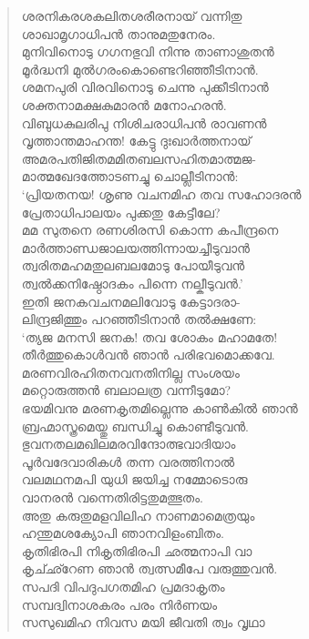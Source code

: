 \begin{verse}
ശരനികരശകലിതശരീരനായ് വന്നിതു\\
ശാഖാമൃഗാധിപന്‍ താനുമതുനേരം.\\
മുനിവിനൊടു ഗഗനഭുവി നിന്നു താണാശുതന്‍\\
മൂര്‍ദ്ധനി മുല്‍ഗരംകൊണ്ടെറിഞ്ഞീടിനാന്‍.\\
ശമനപുരി വിരവിനൊടു ചെന്നു പുക്കീടിനാന്‍\\
ശക്തനാമക്ഷകുമാരന്‍ മനോഹരന്‍.\\
വിബുധകുലരിപു നിശിചരാധിപന്‍ രാവണന്‍\\
വൃത്താന്തമാഹന്ത! കേട്ടു ദുഃഖാര്‍ത്തനായ്\\
അമരപതിജിതമമിതബലസഹിതമാത്മജ-\\
മാത്മഖേദത്തോടണച്ചു ചൊല്ലീടിനാന്‍:\\
‘പ്രിയതനയ! ശൃണു വചനമിഹ തവ സഹോദരന്‍\\
പ്രേതാധിപാലയം പുക്കതു കേട്ടീലേ?\\
മമ സുതനെ രണശിരസി കൊന്ന കപീന്ദ്രനെ\\
മാര്‍ത്താണ്ഡജാലയത്തിന്നായച്ചീടുവാന്‍\\
ത്വരിതമഹമതുലബലമോടു പോയീടുവന്‍\\
ത്വല്‍ക്കനിഷ്ഠോദകം പിന്നെ നല്കീടുവന്‍.’\\
ഇതി ജനകവചനമലിവോടു കേട്ടാദരാ-\\
ലിന്ദ്രജിത്തും പറഞ്ഞീടിനാന്‍ തല്‍ക്ഷണേ:\\
‘ത്യജ മനസി ജനക! തവ ശോകം മഹാമതേ!\\
തീര്‍ത്തുകൊള്‍വന്‍ ഞാന്‍ പരിഭവമൊക്കവേ.\\
മരണവിരഹിതനവനതിനില്ല സംശയം\\
മറ്റൊരുത്തന്‍ ബലാലത്ര വന്നീടുമോ?\\
ഭയമിവനു മരണകൃതമില്ലെന്നു കാണ്‍കില്‍ ഞാന്‍\\
ബ്രഹ്മാസ്ത്രമെയ്തു ബന്ധിച്ചു കൊണ്ടീടുവന്‍.\\
ഭുവനതലമഖിലമരവിന്ദോത്ഭവാദിയാം\\
പൂര്‍വദേവാരികള്‍ തന്ന വരത്തിനാല്‍\\
വലമഥനമപി യുധി ജയിച്ച നമ്മോടൊരു\\
വാനരന്‍ വന്നെതിരിട്ടതുമത്ഭുതം.\\
അതു കരുതുമളവിലിഹ നാണമാമെത്രയും\\
ഹന്തുമശക്യോപി ഞാനവിളംബിതം.\\
കൃതിഭിരപി നികൃതിഭിരപി ഛത്മനാപി വാ\\
കൃച്ഛ്റേണ ഞാന്‍ ത്വത്സമീപേ വരുത്തുവന്‍.\\
സപദി വിപദുപഗതമിഹ പ്രമദാകൃതം\\
സമ്പദ്വിനാശകരം പരം നിര്‍ണയം\\
സസുഖമിഹ നിവസ മയി ജീവതി ത്വം വൃഥാ\\

\end{verse}
